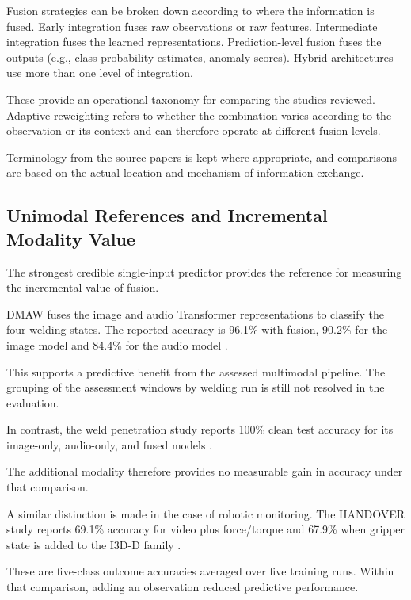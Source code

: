 Fusion strategies can be broken down according to where the information is fused. Early integration
fuses raw observations or raw features. Intermediate integration fuses the learned representations.
Prediction-level fusion fuses the outputs (e.g., class probability estimates, anomaly scores).
Hybrid architectures use more than one level of integration.

These provide an operational taxonomy for comparing the studies reviewed. Adaptive reweighting
refers to whether the combination varies according to the observation or its context and can
therefore operate at different fusion levels.

Terminology from the source papers is kept where appropriate, and comparisons are based on the
actual location and mechanism of information exchange.

\subsection{Unimodal References and Incremental Modality Value}

The strongest credible single-input predictor provides the reference for measuring the incremental value of fusion.

DMAW fuses the image and
audio Transformer representations to classify the four welding states. The reported accuracy is
96.1\% with fusion, 90.2\% for the image model and 84.4\% for the audio model \parencite[Table~III]{fan_dmaw_2026}.

This supports a predictive benefit from the assessed multimodal pipeline. The grouping of the
assessment windows by welding run is still not resolved in the evaluation.

In contrast, the weld penetration study reports 100\% clean test accuracy for its image-only,
audio-only, and fused models \parencite[Tables~1--3]{hua_anti-interference_2026}.

The additional modality therefore provides no measurable gain in accuracy under that comparison.

A similar distinction is made in the case of robotic monitoring. The HANDOVER study reports 69.1\%
accuracy for video plus force/torque and 67.9\% when gripper state is added to the I3D-D family
\parencite[Table~III]{thoduka_multimodal_2024}.

These are five-class outcome accuracies averaged over five training runs. Within that comparison, adding an observation reduced predictive performance.

